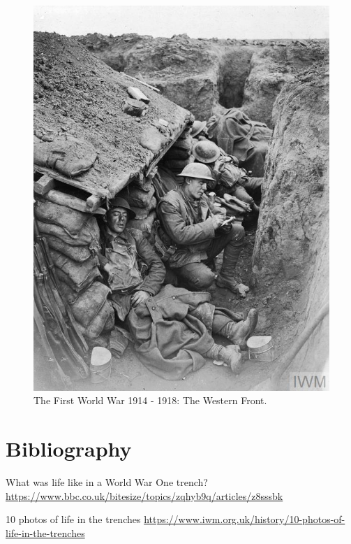\documentclass[letterpaper,12pt]{article}
\begin{document}
\begin{figure}[!htb] 
        \centering \includegraphics[width=0.5\columnwidth]{large_000000}
        \caption{
                \label{fig:trenche} %
                The First World War 1914 - 1918: The Western Front.
        }
\end{figure}



\section{Bibliography}

\begin{thebibliography}{99}

What was life like in a World War One trench?
    \href{https://www.bbc.co.uk/bitesize/topics/zqhyb9q/articles/z8sssbk}{https://www.bbc.co.uk/bitesize/topics/zqhyb9q/articles/z8sssbk}

10 photos of life in the trenches
    \href{https://www.iwm.org.uk/history/10-photos-of-life-in-the-trenches}{https://www.iwm.org.uk/history/10-photos-of-life-in-the-trenches}


\end{thebibliography}
\end{document}
